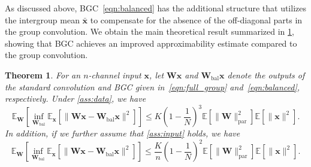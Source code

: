 \documentclass[preprint,12pt,authoryear]{elsarticle}
\numberwithin{equation}{section}
\newtheorem{theorem}{Theorem}[section]
\theoremstyle{remark}
\newcommand\bW{\mathbf{W}}
\newcommand\bx{\mathbf{x}}
\newcommand\bbE{\mathbb{E}}
\newcommand\bal{\mathrm{bal}}
\newcommand\param{\mathrm{par}}
\begin{document}
As discussed above, BGC~\eqref{eqn:balanced} has the additional structure that utilizes the intergroup mean $\bar{\bx}$ to compensate for the absence of the off-diagonal parts in the group convolution.
We obtain the main theoretical result summarized in \cref{thm:2}, showing that BGC achieves an improved approximability estimate compared to the group convolution.

\begin{theorem}
  \label{thm:2}
  For an $n$-channel input $\bx$, let $\bW \bx$ and $\bW_{\bal} \bx$ denote the outputs of the standard convolution and BGC given in~\eqref{eqn:full_group} and~\eqref{eqn:balanced}, respectively.
  Under \cref{ass:data}, we have
  \begin{equation*}
  \bbE_{\bW} \left[ \inf_{\bW_{\bal}} \bbE_{\bx} \left[ \| \bW \bx - \bW_{\bal} \bx \|^2 \right] \right]
  \leq K \left( 1 - \frac{1}{N} \right)^3 \bbE \left[ \| \bW \|_{\param}^2 \right] \bbE \left[ \| \bx \|^2 \right].
  \end{equation*}
  In addition, if we further assume that \cref{ass:input} holds, we have
  \begin{equation*}
  \bbE_{\bW} \left[ \inf_{\bW_{\bal}} \bbE_{\bx} \left[ \| \bW \bx - \bW_{\bal} \bx \|^2 \right] \right]
  \leq \frac{K}{n} \left( 1 - \frac{1}{N} \right)^{2} \bbE \left[ \| \bW \|_{\param}^2 \right] \bbE \left[ \| \bx \|^2 \right].
  \end{equation*}
\end{theorem}
\end{document}
